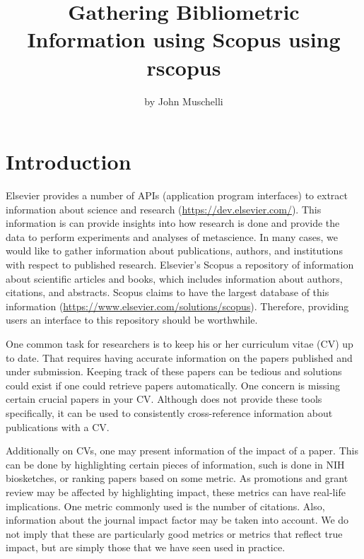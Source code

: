 \title{Gathering Bibliometric Information using Scopus using rscopus}
\author{by John Muschelli}

\maketitle



\hypertarget{introduction}{%
\section{Introduction}\label{introduction}}

Elsevier provides a number of APIs (application program interfaces) to
extract information about science and research
(\url{https://dev.elsevier.com/}). This information is can provide
insights into how research is done and provide the data to perform
experiments and analyses of metascience. In many cases, we would like to
gather information about publications, authors, and institutions with
respect to published research. Elsevier's Scopus a repository of
information about scientific articles and books, which includes
information about authors, citations, and abstracts. Scopus claims to
have the largest database of this information
(\url{https://www.elsevier.com/solutions/scopus}). Therefore, providing
users an interface to this repository should be worthwhile.

One common task for researchers is to keep his or her curriculum vitae
(CV) up to date. That requires having accurate information on the papers
published and under submission. Keeping track of these papers can be
tedious and solutions could exist if one could retrieve papers
automatically. One concern is missing certain crucial papers in your CV.
Although  does not provide these tools specifically, it can
be used to consistently cross-reference information about publications
with a CV.

Additionally on CVs, one may present information of the impact of a
paper. This can be done by highlighting certain pieces of information,
such is done in NIH biosketches, or ranking papers based on some metric.
As promotions and grant review may be affected by highlighting impact,
these metrics can have real-life implications. One metric commonly used
is the number of citations. Also, information about the journal impact
factor may be taken into account. We do not imply that these are
particularly good metrics or metrics that reflect true impact, but are
simply those that we have seen used in practice.\\

